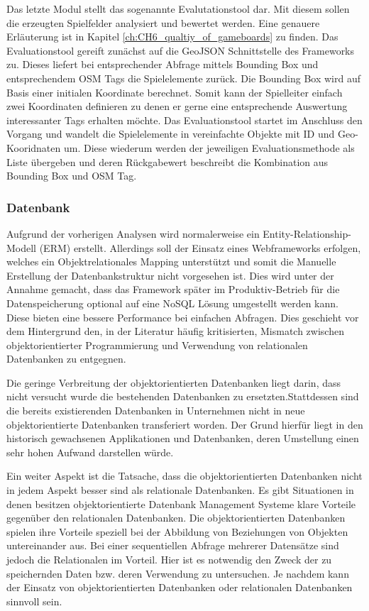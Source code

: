 Das letzte Modul stellt das sogenannte Evalutationstool dar.
Mit diesem sollen die erzeugten Spielfelder analysiert und bewertet werden. Eine genauere Erläuterung ist in Kapitel \ref{ch:CH6_qualtiy_of_gameboards} zu finden.
Das Evaluationstool gereift zunächst auf die GeoJSON Schnittstelle des Frameworks zu. Dieses liefert bei entsprechender Abfrage mittels Bounding Box und entsprechendem OSM Tags die Spielelemente zurück. Die Bounding Box wird auf Basis einer initialen Koordinate berechnet. Somit kann der Spielleiter einfach zwei Koordinaten definieren zu denen er gerne eine entsprechende Auswertung interessanter Tags erhalten möchte. Das Evaluationstool startet im Anschluss den Vorgang und wandelt die Spielelemente in vereinfachte Objekte mit ID und Geo-Kooridnaten um. Diese wiederum werden der jeweiligen Evaluationsmethode als Liste übergeben und deren Rückgabewert beschreibt die Kombination aus Bounding Box und OSM Tag.

\subsubsection*{Datenbank}

Aufgrund der vorherigen Analysen wird normalerweise ein Entity-Relationship-Modell (ERM) erstellt. Allerdings soll der Einsatz eines Webframeworks erfolgen, welches ein Objektrelationales Mapping unterstützt und somit die Manuelle Erstellung der Datenbankstruktur nicht vorgesehen ist. Dies wird unter der Annahme gemacht, dass das Framework später im Produktiv-Betrieb für die Datenspeicherung optional auf eine NoSQL Lösung umgestellt werden kann. Diese bieten eine bessere Performance bei einfachen Abfragen.
Dies geschieht vor dem Hintergrund den, in der Literatur häufig kritisierten, Mismatch zwischen objektorientierter Programmierung und Verwendung von relationalen Datenbanken zu entgegnen.\cite{Cattell.1991}

Die geringe Verbreitung der objektorientierten Datenbanken liegt darin, dass nicht
versucht wurde die bestehenden Datenbanken zu ersetzten.Stattdessen sind die bereits existierenden Datenbanken in Unternehmen nicht in neue objektorientierte Datenbanken transferiert worden. Der Grund hierfür liegt in den historisch gewachsenen Applikationen und Datenbanken, deren Umstellung einen sehr hohen Aufwand darstellen würde.\cite{Burleson.1994}

Ein weiter Aspekt ist die Tatsache, dass die objektorientierten Datenbanken nicht in jedem Aspekt
besser sind als relationale Datenbanken. Es gibt Situationen in denen besitzen objektorientierte
Datenbank Management Systeme klare Vorteile gegenüber den relationalen Datenbanken.
Die objektorientierten Datenbanken spielen ihre Vorteile speziell bei der Abbildung von Beziehungen von Objekten untereinander aus. Bei einer sequentiellen Abfrage mehrerer Datensätze sind
jedoch die Relationalen im Vorteil.\cite{Van.2006} Hier ist es notwendig den Zweck der zu speichernden Daten bzw. deren Verwendung zu untersuchen. Je nachdem kann der Einsatz von objektorientierten Datenbanken oder relationalen Datenbanken sinnvoll sein.

